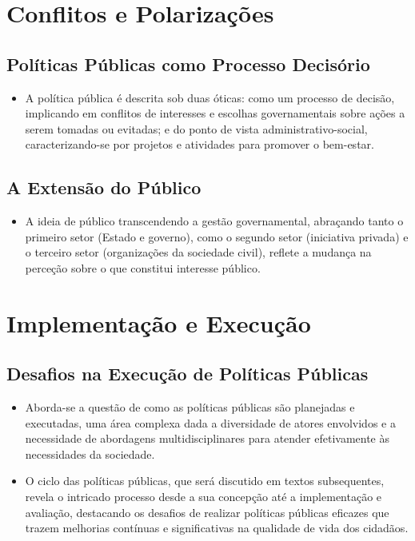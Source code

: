\documentclass[
   article,       
   12pt,          
   oneside,       
   a4paper,       
   english,       
   brazil,        
   sumario=tradicional
   ]{abntex2}
\begin{document}
\section{Conflitos e Polarizações}

\subsection{Políticas Públicas como Processo Decisório}
\begin{itemize}
    \item A política pública é descrita sob duas óticas: como um processo de decisão, implicando em conflitos de interesses e escolhas governamentais sobre ações a serem tomadas ou evitadas; e do ponto de vista administrativo-social, caracterizando-se por projetos e atividades para promover o bem-estar.
\end{itemize}

\subsection{A Extensão do Público}
\begin{itemize}
    \item A ideia de público transcendendo a gestão governamental, abraçando tanto o primeiro setor (Estado e governo), como o segundo setor (iniciativa privada) e o terceiro setor (organizações da sociedade civil), reflete a mudança na perceção sobre o que constitui interesse público.
\end{itemize}

\section{Implementação e Execução}

\subsection{Desafios na Execução de Políticas Públicas}
\begin{itemize}
    \item Aborda-se a questão de como as políticas públicas são planejadas e executadas, uma área complexa dada a diversidade de atores envolvidos e a necessidade de abordagens multidisciplinares para atender efetivamente às necessidades da sociedade.
    \item O ciclo das políticas públicas, que será discutido em textos subsequentes, revela o intricado processo desde a sua concepção até a implementação e avaliação, destacando os desafios de realizar políticas públicas eficazes que trazem melhorias contínuas e significativas na qualidade de vida dos cidadãos.
\end{itemize}
\end{document}
